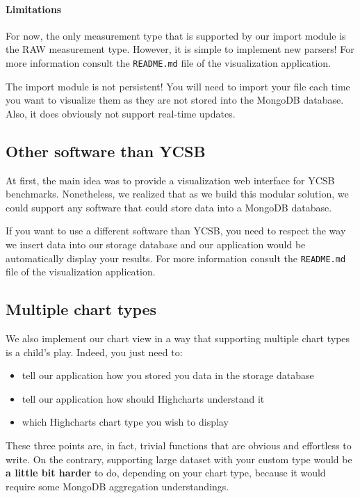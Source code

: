 \documentclass[a4paper,11pt]{report}
\begin{document}
\paragraph{Limitations}

For now, the only measurement type that is supported by our import module is the RAW measurement type. However, it is simple to implement new parsers! For more information consult the \texttt{README.md} file of the visualization application.

The import module is not persistent! You will need to import your file each time you want to visualize them as they are not stored into the MongoDB database.
Also, it does obviously not support real-time updates.

\subsection{Other software than YCSB}

At first, the main idea was to provide a visualization web interface for YCSB benchmarks. Nonetheless, we realized that as we build this modular solution, we could support any software that could store data into a MongoDB database.

If you want to use a different software than YCSB, you need to respect the way we insert data into our storage database and our application would be automatically display your results. For more information consult the \texttt{README.md} file of the visualization application.

\subsection{Multiple chart types}

We also implement our chart view in a way that supporting multiple chart types is a child's play. Indeed, you just need to:

\begin{itemize}
\item
tell our application how you stored you data in the storage database
\item
tell our application how should Highcharts understand it
\item
which Highcharts chart type you wish to display
\end{itemize}

These three points are, in fact, trivial functions that are obvious and effortless to write. On the contrary, supporting large dataset with your custom type would be \textbf{a little bit harder} to do, depending on your chart type, because it would require some MongoDB aggregation understandings.
\end{document}
